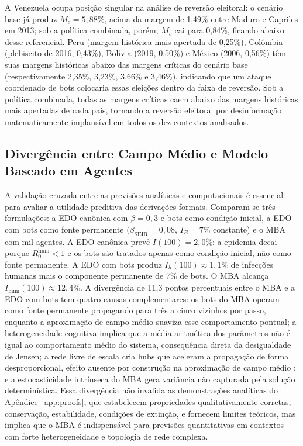 \documentclass[12pt,a4paper]{article}
\theoremstyle{definition}
\theoremstyle{plain}
\begin{document}
A Venezuela ocupa posição singular na análise de reversão eleitoral: o cenário base já produz $M_c = 5{,}88\%$, acima da margem de 1,49\% entre Maduro e Capriles em 2013; sob a política combinada, porém, $M_c$ cai para 0,84\%, ficando abaixo desse referencial. Peru (margem histórica mais apertada de 0,25\%), Colômbia (plebiscito de 2016, 0,43\%), Bolívia (2019, 0,50\%) e México (2006, 0,56\%) têm suas margens históricas abaixo das margens críticas do cenário base (respectivamente 2,35\%, 3,23\%, 3,66\% e 3,46\%), indicando que um ataque coordenado de bots colocaria essas eleições dentro da faixa de reversão. Sob a política combinada, todas as margens críticas caem abaixo das margens históricas mais apertadas de cada país, tornando a reversão eleitoral por desinformação matematicamente implausível em todos os dez contextos analisados.

\subsection{Divergência entre Campo Médio e Modelo Baseado em Agentes}
\label{subsec:comparison}

A validação cruzada entre as previsões analíticas e computacionais é essencial para avaliar a utilidade preditiva das derivações formais. Comparam-se três formulações: a EDO canônica com $\beta = 0{,}3$ e bots como condição inicial, a EDO com bots como fonte permanente ($\beta_{\text{SEIR}} = 0{,}08$, $I_B = 7\%$ constante) e o MBA com mil agentes. A EDO canônica prevê $I(100) = 2{,}0\%$: a epidemia decai porque $R_0^{\text{hum}} < 1$ e os bots são tratados apenas como condição inicial, não como fonte permanente. A EDO com bots produz $I_h(100) \approx 1{,}1\%$ de infecções humanas mais o componente permanente de 7\% de bots. O MBA alcança $I_{\text{hum}}(100) \approx 12{,}4\%$. A divergência de 11,3 pontos percentuais entre o MBA e a EDO com bots tem quatro causas complementares: os bots do MBA operam como fonte permanente propagando para três a cinco vizinhos por passo, enquanto a aproximação de campo médio suaviza esse comportamento pontual; a heterogeneidade cognitiva implica que a média aritmética dos parâmetros não é igual ao comportamento médio do sistema, consequência direta da desigualdade de Jensen; a rede livre de escala cria hubs que aceleram a propagação de forma desproporcional, efeito ausente por construção na aproximação de campo médio \citep{pastor2001epidemic}; e a estocasticidade intrínseca do MBA gera variância não capturada pela solução determinística. Essa divergência não invalida as demonstrações analíticas do Apêndice~\ref{app:proofs}, que estabelecem propriedades qualitativamente corretas, conservação, estabilidade, condições de extinção, e fornecem limites teóricos, mas implica que o MBA é indispensável para previsões quantitativas em contextos com forte heterogeneidade e topologia de rede complexa.
\end{document}
